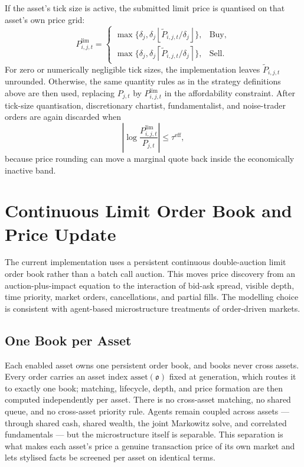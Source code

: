 \documentclass[12pt, a4paper]{article}
\begin{document}
    If the asset's tick size is active, the submitted limit price is quantised on
    that asset's own price grid:
    \begin{equation}
        P_{i,j,t}^{\text{lim}}=
        \begin{cases}
            \max\{\delta_j,\delta_j\left\lfloor \tilde P_{i,j,t}/\delta_j\right\rfloor\}, & \mathrm{Buy},\\
            \max\{\delta_j,\delta_j\left\lceil \tilde P_{i,j,t}/\delta_j\right\rceil\}, & \mathrm{Sell}.
        \end{cases}
    \end{equation}
    For zero or numerically negligible tick sizes, the implementation leaves
    \(\tilde P_{i,j,t}\) unrounded. Otherwise, the same quantity rules as in the
    strategy definitions above are then used, replacing \(P_{j,t}\) by
    \(P_{i,j,t}^{\text{lim}}\) in the affordability constraint. After tick-size
    quantisation, discretionary chartist, fundamentalist, and noise-trader orders
    are again discarded when
    \[
        \left|\log\frac{P_{i,j,t}^{\text{lim}}}{P_{j,t}}\right|
        \le \tau^{\mathrm{eff}},
    \]
    because price rounding can move a marginal quote back inside the economically
    inactive band.

    \section{Continuous Limit Order Book and Price Update}\label{sec:continuous_lob}

    The current implementation uses a persistent continuous double-auction limit
    order book rather than a batch call auction. This moves price discovery from an
    auction-plus-impact equation to the interaction of bid-ask spread, visible
    depth, time priority, market orders, cancellations, and partial fills. The
    modelling choice is consistent with agent-based microstructure treatments of
    order-driven markets.

    \subsection{One Book per Asset}

    Each enabled asset owns one persistent order book, and books never cross
    assets. Every order carries an asset index \(\mathrm{asset}(\mathfrak{o})\)
    fixed at generation, which routes it to exactly one book; matching, lifecycle,
    depth, and price formation are then computed independently per asset. There is
    no cross-asset matching, no shared queue, and no cross-asset priority rule.
    Agents remain coupled across assets --- through shared cash, shared wealth,
    the joint Markowitz solve, and correlated fundamentals --- but the
    microstructure itself is separable. This separation is what makes each asset's
    price a genuine transaction price of its own market and lets stylised facts be
    screened per asset on identical terms.
\end{document}
